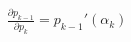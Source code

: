 \documentclass[preview]{standalone}
\begin{document}
\begin{align*}
\frac{\partial p_{k-1}}{\partial p_k} = p_{k-1}'( \alpha _k)
\end{align*}
\end{document}
